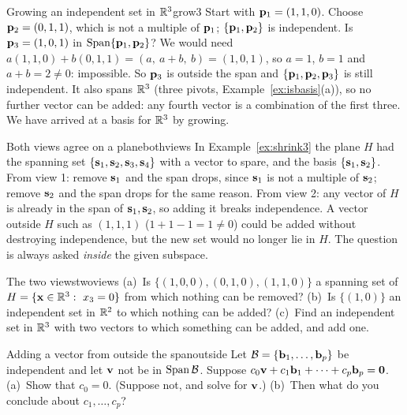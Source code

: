 \documentclass[11pt]{article}
\begin{document}
\begin{exmp}{Growing an independent set in $\mathbb{R}^3$}{grow3}
Start with $\mathbf{p}_1=(1,1,0)$. Choose $\mathbf{p}_2=(0,1,1)$, which is not a multiple of $\mathbf{p}_1$; $\{\mathbf{p}_1,\mathbf{p}_2\}$ is independent. Is $\mathbf{p}_3=(1,0,1)$ in $\operatorname{Span}\{\mathbf{p}_1,\mathbf{p}_2\}$? We would need $a(1,1,0)+b(0,1,1)=(a,\ a+b,\ b)=(1,0,1)$, so $a=1$, $b=1$ and $a+b=2\neq0$: impossible. So $\mathbf{p}_3$ is outside the span and $\{\mathbf{p}_1,\mathbf{p}_2,\mathbf{p}_3\}$ is still independent. It also spans $\mathbb{R}^3$ (three pivots, Example~\ref{ex:isbasis}(a)), so no further vector can be added: any fourth vector is a combination of the first three. We have arrived at a basis for $\mathbb{R}^3$ by growing.
\end{exmp}

\begin{exmp}{Both views agree on a plane}{bothviews}
In Example~\ref{ex:shrink3} the plane $H$ had the spanning set $\{\mathbf{s}_1,\mathbf{s}_2,\mathbf{s}_3,\mathbf{s}_4\}$ with a vector to spare, and the basis $\{\mathbf{s}_1,\mathbf{s}_2\}$. From view 1: remove $\mathbf{s}_1$ and the span drops, since $\mathbf{s}_1$ is not a multiple of $\mathbf{s}_2$; remove $\mathbf{s}_2$ and the span drops for the same reason. From view 2: any vector of $H$ is already in the span of $\mathbf{s}_1,\mathbf{s}_2$, so adding it breaks independence. A vector outside $H$ such as $(1,1,1)$ ($1+1-1=1\neq0$) could be added without destroying independence, but the new set would no longer lie in $H$. The question is always asked \emph{inside} the given subspace.
\end{exmp}

\begin{kc}{The two views}{twoviews}
(a)~Is $\{(1,0,0),(0,1,0),(1,1,0)\}$ a spanning set of $H=\{\bv{x}\in\R^3:\ x_3=0\}$ from which nothing can be removed? (b)~Is $\{(1,0)\}$ an independent set in $\mathbb{R}^2$ to which nothing can be added? (c)~Find an independent set in $\mathbb{R}^3$ with two vectors to which something can be added, and add one.
\end{kc}

\begin{think}{Adding a vector from outside the span}{outside}
Let $\mathcal{B}=\{\mathbf{b}_1,\dots,\mathbf{b}_p\}$ be independent and let $\mathbf{v}$ not be in $\operatorname{Span}\mathcal{B}$. Suppose $c_0\mathbf{v}+c_1\mathbf{b}_1+\cdots+c_p\mathbf{b}_p=\mathbf{0}$. (a)~Show that $c_0=0$. (Suppose not, and solve for $\mathbf{v}$.) (b)~Then what do you conclude about $c_1,\dots,c_p$?
\end{think}

\end{document}

